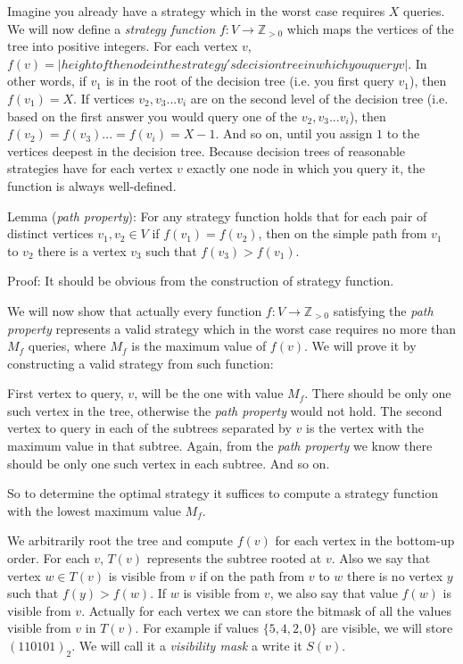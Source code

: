 
Imagine you already have a strategy which in the worst case requires $X$ queries.
We will now define a \emph{strategy function} $f : V \to \mathbb Z_{> 0}$ which maps
the vertices of the tree into positive integers. For each vertex $v$,
$f(v) = |height of the node in the strategy's decision tree in which you query v|$.
In other words, if $v_1$ is in the root of the decision tree (i.e. you first query $v_1$), then $f(v_1) = X$.
If vertices $v_2, v_3 ... v_i$ are on the second level of the decision tree
(i.e. based on the first answer you would query one of the $v_2, v_3 ... v_i$), then $f(v_2) = f(v_3) ... = f(v_i) = X-1$.
And so on, until you assign $1$ to the vertices deepest in the decision tree.
Because decision trees of reasonable strategies have for each vertex $v$ exactly
one node in which you query it, the function is always well-defined.

Lemma (\emph{path property}):
For any strategy function holds that for each pair of distinct vertices $v_1, v_2 \in V$ if $f(v_1) = f(v_2)$, then
on the simple path from $v_1$ to $v_2$ there is a vertex $v_3$ such that $f(v_3) > f(v_1)$.

Proof:
It should be obvious from the construction of strategy function.

We will now show that actually every function $f : V \to \mathbb Z_{> 0}$ satisfying
the \emph{path property} represents a valid strategy which in the worst case
requires no more than $M_f$ queries, where $M_f$ is the maximum value of $f(v)$.
We will prove it by constructing a valid strategy from such function:

First vertex to query, $v$, will be the one with value $M_f$. There should be only
one such vertex in the tree, otherwise the \emph{path property} would not hold.
The second vertex to query in each of the subtrees separated by $v$ is the vertex with
the maximum value in that subtree. Again, from the \emph{path property} we know
there should be only one such vertex in each subtree. And so on.

So to determine the optimal strategy it suffices to compute a strategy function
with the lowest maximum value $M_f$.

We arbitrarily root the tree and compute $f(v)$ for each vertex in the bottom-up order.
For each $v$, $T(v)$ represents the subtree rooted at $v$.
Also we say that vertex $w \in T(v)$ is visible from $v$ if on the path from $v$
to $w$ there is no vertex $y$ such that $f(y) > f(w)$. If $w$ is visible from $v$,
we also say that value $f(w)$ is visible from $v$. Actually for each vertex
we can store the bitmask of all the values visible from $v$ in $T(v)$. For
example if values $\{5,4,2,0\}$ are visible, we will store $(110101)_2$. We will
call it a \emph{visibility mask} a write it $S(v)$.


